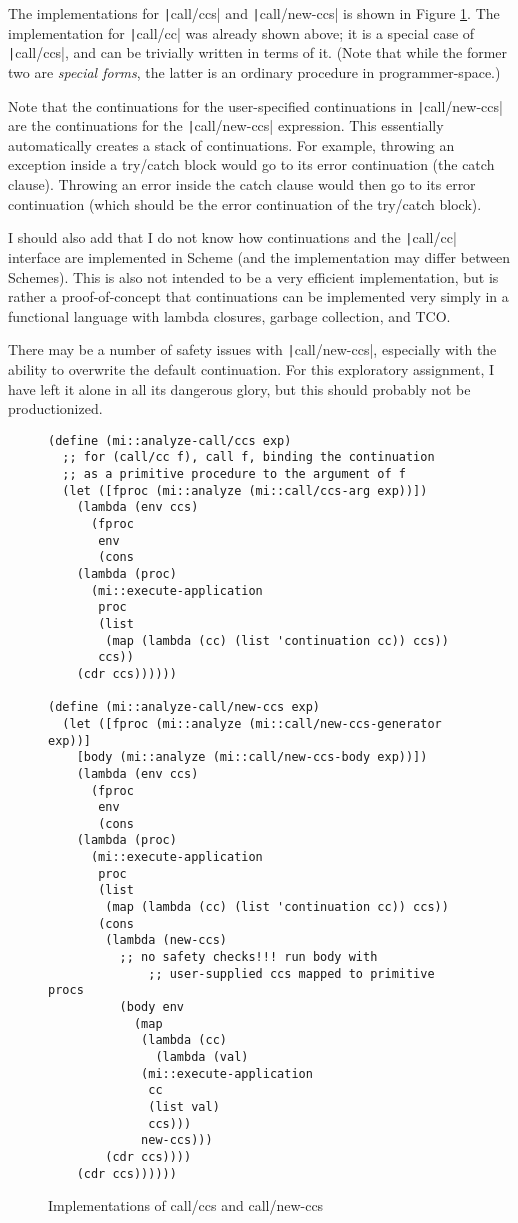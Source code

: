 \documentclass[]{article}
\begin{document}
The implementations for \texttt|call/ccs| and \texttt|call/new-ccs| is shown in Figure \ref{fig:impl}. The implementation for \texttt|call/cc| was already shown above; it is a special case of \texttt|call/ccs|, and can be trivially written in terms of it. (Note that while the former two are \textit{special forms}, the latter is an ordinary procedure in programmer-space.)

Note that the continuations for the user-specified continuations in \texttt|call/new-ccs| are the continuations for the \texttt|call/new-ccs| expression. This essentially automatically creates a stack of continuations. For example, throwing an exception inside a try/catch block would go to its error continuation (the catch clause). Throwing an error inside the catch clause would then go to its error continuation (which should be the error continuation of the try/catch block).

I should also add that I do not know how continuations and the \texttt|call/cc| interface are implemented in Scheme (and the implementation may differ between Schemes). This is also not intended to be a very efficient implementation, but is rather a proof-of-concept that continuations can be implemented very simply in a functional language with lambda closures, garbage collection, and TCO.

There may be a number of safety issues with \texttt|call/new-ccs|, especially with the ability to overwrite the default continuation. For this exploratory assignment, I have left it alone in all its dangerous glory, but this should probably not be productionized.

\begin{figure}
  \centering
\begin{verbatim}
(define (mi::analyze-call/ccs exp)
  ;; for (call/cc f), call f, binding the continuation
  ;; as a primitive procedure to the argument of f
  (let ([fproc (mi::analyze (mi::call/ccs-arg exp))])
    (lambda (env ccs)
      (fproc
       env
       (cons
	(lambda (proc)
	  (mi::execute-application
	   proc
	   (list
	    (map (lambda (cc) (list 'continuation cc)) ccs))
	   ccs))
	(cdr ccs))))))

(define (mi::analyze-call/new-ccs exp)
  (let ([fproc (mi::analyze (mi::call/new-ccs-generator exp))]
	[body (mi::analyze (mi::call/new-ccs-body exp))])
    (lambda (env ccs)
      (fproc
       env
       (cons
	(lambda (proc)
	  (mi::execute-application
	   proc
	   (list
	    (map (lambda (cc) (list 'continuation cc)) ccs))
	   (cons
	    (lambda (new-ccs)
	      ;; no safety checks!!! run body with 
              ;; user-supplied ccs mapped to primitive procs
	      (body env
		    (map
		     (lambda (cc)
		       (lambda (val)
			 (mi::execute-application
			  cc
			  (list val)
			  ccs)))
		     new-ccs)))
	    (cdr ccs))))
	(cdr ccs))))))
\end{verbatim}
  \caption{Implementations of call/ccs and call/new-ccs}
  \label{fig:impl}
\end{figure}
\end{document}
